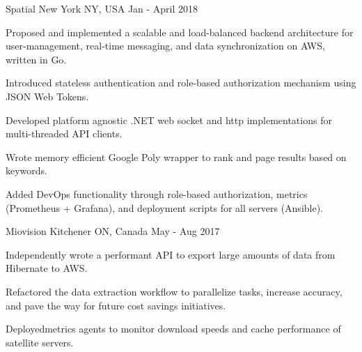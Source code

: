 \begin{cventries}
   {Spatial} {New York NY, USA} {Jan - April
    2018} {
    \begin{cvitems}
    \item Proposed and implemented a scalable and load-balanced backend
      architecture for user-management, real-time messaging, and data
      synchronization on AWS, written in Go.
    \item Introduced stateless authentication and role-based authorization
      mechanism using JSON Web Tokens.
    \item Developed platform agnostic .NET web socket and http implementations
      for multi-threaded API clients.
    \item Wrote memory efficient Google Poly wrapper to rank and page results
      based on keywords.
    \item Added DevOps functionality through role-based authorization, metrics
      (Prometheus + Grafana), and deployment scripts for all servers (Ansible).
    \end{cvitems}
  }
    
   {Miovision} {Kitchener ON, Canada} {May -
    Aug 2017} {
    \begin{cvitems}
    \item Independently wrote a performant API to export large amounts of data
      from Hibernate to AWS.
    \item Refactored the data extraction workflow to parallelize tasks, increase
      accuracy, and pave the way for future cost savings initiatives.
    \item Deployedmetrics agents to monitor download speeds and cache
      performance of satellite servers.
    \end{cvitems}
  }

\end{cventries}
